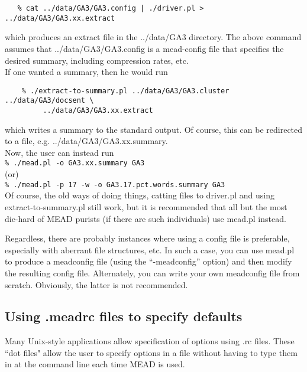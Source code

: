 \documentclass[10pt]{article}
\begin{document}
\begin{verbatim}
   % cat ../data/GA3/GA3.config | ./driver.pl > ../data/GA3/GA3.xx.extract 
\end{verbatim}

\noindent
which produces an extract file in the ../data/GA3 directory.  The above
command assumes that ../data/GA3/GA3.config is a mead-config file that 
specifies the desired summary, including compression rates, etc.\\

If one wanted a summary, then he would run

\begin{verbatim}
    % ./extract-to-summary.pl ../data/GA3/GA3.cluster ../data/GA3/docsent \
         ../data/GA3/GA3.xx.extract
\end{verbatim}

\noindent
which writes a summary to the standard output.  Of course, this can be 
redirected to a file, e.g. ../data/GA3/GA3.xx.summary.\\

Now, the user can instead run\\

    \verb|% ./mead.pl -o GA3.xx.summary GA3|\\

\noindent
(or)\\

    \verb|% ./mead.pl -p 17 -w -o GA3.17.pct.words.summary GA3|\\

Of course, the old ways of doing things, catting files to driver.pl and 
using extract-to-summary.pl still work, but it is recommended that
all but the most die-hard of MEAD purists (if there are such individuals)
use mead.pl instead.

Regardless, there are probably instances where using a config 
file is preferable, especially with aberrant file structures, etc.
In such a case, you can use mead.pl to produce a meadconfig file
(using the ``-meadconfig'' option) and then modify the resulting config
file.  Alternately, you can write your own meadconfig file from 
scratch.  Obviously, the latter is not recommended.



\subsection{Using .meadrc files to specify defaults}

Many Unix-style applications allow specification of options using .rc
files.  These ``dot files" allow the user to specify options in a file 
without having to type them in at the command line each time MEAD is used.
\end{document}
